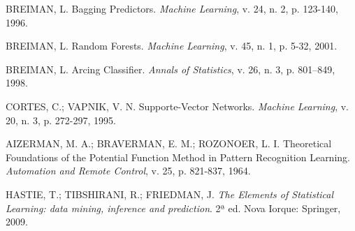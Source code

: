 \documentclass[twocolumn]{rbef}
\newcommand{\1}{\mathbbm{1}}
\begin{document}
\begin{thebibliography}{99}
 BREIMAN, L. Bagging Predictors. \textit{Machine Learning}, v. 24, n. 2, p. 123-140, 1996.

 BREIMAN, L. Random Forests. \textit{Machine Learning}, v. 45, n. 1, p. 5-32, 2001.

 BREIMAN, L. Arcing Classifier. \textit{Annals of Statistics}, v. 26, n. 3, p. 801–849, 1998.

 CORTES, C.; VAPNIK, V. N. Supporte-Vector Networks. \textit{Machine Learning}, v. 20, n. 3, p. 272-297, 1995.

 AIZERMAN, M. A.; BRAVERMAN, E. M.; ROZONOER, L. I. Theoretical Foundations of the Potential Function Method in Pattern Recognition Learning. \textit{Automation and Remote Control}, v. 25, p. 821-837, 1964.

 HASTIE, T.; TIBSHIRANI, R.; FRIEDMAN, J. \textit{The Elements of Statistical Learning: data mining, inference and prediction}. 2ª ed. Nova Iorque: Springer, 2009.

\end{thebibliography}
\end{document}
